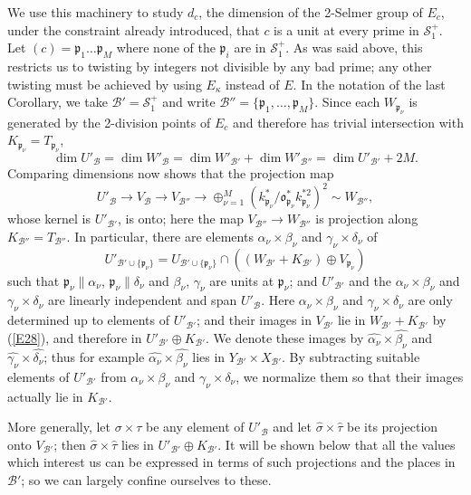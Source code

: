 \documentclass[12pt]{article}
\def\fo{{\mathfrak o}}
\def\fp{{\mathfrak p}}
\def\ga{{\alpha}}
\def\gb{{\beta}}
\def\gg{{\gamma}}
\def\gd{{\delta}}
\def\gk{{\kappa}}
\def\gs{{\sigma}}
\def\sB{{\mathcal B}}
\def\sS{{\mathcal S}}
\def\beq{\begin{equation} \label}
\begin{document}
We use this machinery to study $d_c$, the dimension of the
2-Selmer group of $E_c$, under the constraint already
introduced, that $c$ is a unit at every
prime in $\sS^+_1$.
Let $(c)=\fp_1\ldots\fp_M$ where none of the $\fp_i$ are in
$\sS^+_1$. As was said above,
this restricts us to twisting by integers not divisible by any
bad prime; any other twisting must be achieved by
using $E_\gk$ instead of $E$.
In the notation of the last Corollary, we take $\sB'=\sS^+_1$
and write $\sB''=\{\fp_1,\ldots,\fp_M\}$. Since each
$W_{\fp_\nu}$ is generated by the 2-division points of $E_c$ and therefore
has trivial intersection with $K_{\fp_\nu}=T_{\fp_\nu}$,
\beq{E95} \dim U'_\sB=\dim W'_\sB=\dim W'_{\sB'}+\dim W'_{\sB''}=\dim U'_{\sB'}+2M. \end{equation}
Comparing dimensions now shows that the projection map
\[ U'_\sB\rightarrow V_\sB\rightarrow V_{\sB''}
\rightarrow\oplus^M_{\nu=1}
(k^*_{\fp_\nu}/\fo_{\fp_\nu}^*k^{*2}_{\fp_\nu})^2
\sim W_{\sB''}, \]
whose kernel is $U'_{\sB'}$, is onto; here the map $V_{\sB''}
\rightarrow W_{\sB''}$ is projection along $K_{\sB''}=
T_{\sB''}$. In particular, there are elements
$\ga_\nu\times\gb_\nu$ and $\gg_\nu\times\gd_\nu$ of
\beq{E28} U'_{\sB'\cup\{\fp_\nu\}}=U_{\sB'\cup\{\fp_\nu\}}\cap((W_{\sB'}+
K_{\sB'})\oplus V_{\fp_\nu}) \end{equation}
such that $\fp_\nu\|\ga_\nu$,
$\fp_\nu\|\gd_\nu$ and $\gb_\nu$, $\gg_\nu$ are units at $\fp_\nu$; and
$U'_{\sB'}$ and the $\ga_\nu\times\gb_\nu$ and $\gg_\nu\times\gd_\nu$ are
linearly independent and span $U'_\sB$. Here
$\ga_\nu\times\gb_\nu$ and $\gg_\nu\times\gd_\nu$ are only
determined up to elements of $U'_{\sB'}$; and their images in
$V_{\sB'}$ lie in $W_{\sB'}+K_{\sB'}$ by (\ref{E28}),
and therefore in $U'_{\sB'}\oplus K_{\sB'}$. We denote these
images by $\widehat{\ga_\nu}\times\widehat{\gb_\nu}$ and
$\widehat{\gg_\nu}\times\widehat{\gd_\nu}$; thus for example
$\widehat{\ga_\nu}\times\widehat{\gb_\nu}$ lies in $Y_{\sB'}
\times X_{\sB'}$. By subtracting suitable elements of $U'_{\sB'}$
from $\ga_\nu\times\gb_\nu$ and $\gg_\nu\times\gd_\nu$, we
normalize them so that their images actually lie in $K_{\sB'}$.

More generally, let $\gs\times\tau$ be any element of $U'_\sB$ and let
$\hat{\gs}\times\hat{\tau}$ be its projection onto $V_{\sB'}$;
then $\hat{\gs}\times\hat{\tau}$ lies in $U'_{\sB'}\oplus
K_{\sB'}$. It will be shown below that all the values which
interest us can be expressed in terms of such projections
and the places in $\sB'$; so we can largely confine
ourselves to these.
\end{document}
